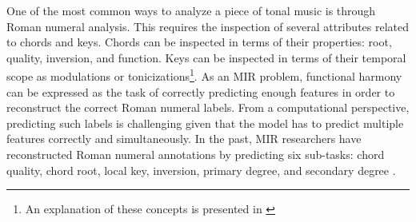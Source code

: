 

One of the most common ways to analyze a piece of tonal
music is through Roman numeral analysis. This requires the
inspection of several attributes related to chords and keys.
Chords can be inspected in terms of their properties: root,
quality, inversion, and function. Keys can be inspected in
terms of their temporal scope as modulations or
tonicizations\footnote{An explanation of these concepts is
presented in \textcite{napoleslopez2020local}}. As an MIR
problem, functional harmony can be expressed as the task of
correctly predicting enough features in order to reconstruct
the correct Roman numeral labels. From a computational
perspective, predicting such labels is challenging
given that the model has to predict multiple features
correctly and simultaneously. In the past, MIR researchers
have reconstructed Roman numeral annotations by predicting
six sub-tasks: chord quality, chord root, local key,
inversion, primary degree, and secondary degree
\parencite{chen2018functional, micchi2020not}.
